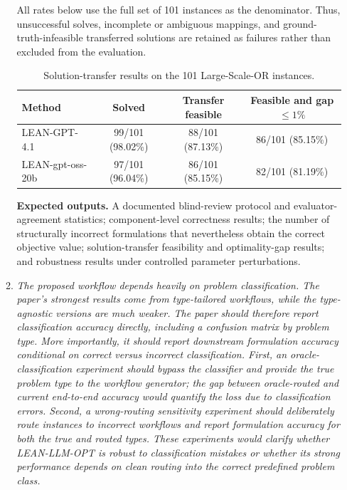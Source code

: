 \documentclass[11pt]{article}
\newcommand{\edit}[1]{{\color{hopkins-blue}\itshape #1}}
\newcommand{\expected}{\noindent\textbf{Expected outputs.} }
\begin{document}
\begin{enumerate}[label=(AssoE.\arabic*),leftmargin=*]
\begin{enumerate}[label=(R1.Major.\arabic*),leftmargin=*]
All rates below use the full set of 101 instances as the denominator. Thus, unsuccessful solves, incomplete or ambiguous mappings, and ground-truth-infeasible transferred solutions are retained as failures rather than excluded from the evaluation.

\begin{table}[!htbp]
\centering
\caption{Solution-transfer results on the 101 Large-Scale-OR instances.}
\label{tab:solution_transfer}
\begin{tabular}{lccc}
\toprule
Method
& Solved
& Transfer feasible
& Feasible and gap $\leq 1\%$ \\
\midrule
LEAN-GPT-4.1
& 99/101 (98.02\%)
& 88/101 (87.13\%)
& 86/101 (85.15\%) \\
LEAN-gpt-oss-20b
& 97/101 (96.04\%)
& 86/101 (85.15\%)
& 82/101 (81.19\%) \\
\bottomrule
\end{tabular}
\end{table}







\expected A documented blind-review protocol and evaluator-agreement statistics; component-level correctness results; the number of structurally incorrect formulations that nevertheless obtain the correct objective value; solution-transfer feasibility and optimality-gap results; and robustness results under controlled parameter perturbations.

\item \edit{The proposed workflow depends heavily on problem classification. The paper's strongest results come from type-tailored workflows, while the type-agnostic versions are much weaker. The paper should therefore report classification accuracy directly, including a confusion matrix by problem type. More importantly, it should report downstream formulation accuracy conditional on correct versus incorrect classification. First, an oracle-classification experiment should bypass the classifier and provide the true problem type to the workflow generator; the gap between oracle-routed and current end-to-end accuracy would quantify the loss due to classification errors. Second, a wrong-routing sensitivity experiment should deliberately route instances to incorrect workflows and report formulation accuracy for both the true and routed types. These experiments would clarify whether LEAN-LLM-OPT is robust to classification mistakes or whether its strong performance depends on clean routing into the correct predefined problem class.

}
\end{enumerate}
\end{enumerate}
\end{document}
